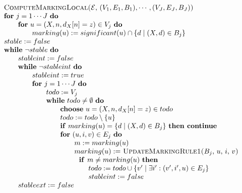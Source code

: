 \begin{equation*}
\begin{array}{l}
\begin{tabular}{l}
\textsc{ComputeMarkingLocal(}$\mathcal{E}$, $(V_{1},E_{1},B_{1}),\cdots
,(V_{J},E_{J},B_{J})$\textsc{)} \\ 
\textbf{for} $j=1\cdots J$ \textbf{do} \\ 
$\qquad $\textbf{for} $u=(X,n,d_{X}[n]=z)\in V_{j}$ \textbf{do} \\ 
$\qquad \qquad marking(u):=significant(u)\cap \{d\mid (X,d)\in B_{j}\}$ \\ 
$stable:=false$ \\ 
\textbf{while} $\lnot stable$ \textbf{do} \\ 
$\qquad stableint:=false$ \\ 
$\qquad $\textbf{while} $\lnot stableint$ \textbf{do} \\ 
$\qquad \qquad stableint:=true$ \\ 
$\qquad \qquad $\textbf{for} $j=1\cdots J$ \textbf{do} \\ 
$\qquad \qquad \qquad todo:=V_{j}$ \\ 
$\qquad \qquad \qquad $\textbf{while} $todo\neq \emptyset $ \textbf{do} \\ 
$\qquad \qquad \qquad \qquad $\textbf{choose} $u=(X,n,d_{X}[n]=z)\in todo$
\\ 
$\qquad \qquad \qquad \qquad todo:=todo\setminus \{u\}$ \\ 
$\qquad \qquad \qquad \qquad $\textbf{if} $marking(u)=\{d\mid (X,d)\in
B_{j}\}$ \textbf{then continue} \\ 
$\qquad \qquad \qquad \qquad $\textbf{for} $(u,i,v)\in E_{j}$ \textbf{do} \\ 
$\qquad \qquad \qquad \qquad \qquad m:=marking(u)$ \\ 
$\qquad \qquad \qquad \qquad \qquad marking(u):=$ \textsc{UpdateMarkingRule1(%
}$B_{j}$, $u$, $i$, $v$\textsc{)} \\ 
$\qquad \qquad \qquad \qquad \qquad \text{\textbf{if }}m\neq marking(u)$ 
\textbf{then} \\ 
$\qquad \qquad \qquad \qquad \qquad \qquad todo:=todo\cup \{v^{\prime }\mid
\exists i^{\prime }:(v^{\prime },i^{\prime },u)\in E_{j}\}$ \\ 
$\qquad \qquad \qquad \qquad \qquad \qquad stableint:=false$ \\ 
$\qquad stableext:=false$%
\end{tabular}
\\ 
\begin{tabular}{l}

\end{tabular}
\end{array}
\end{equation*}
